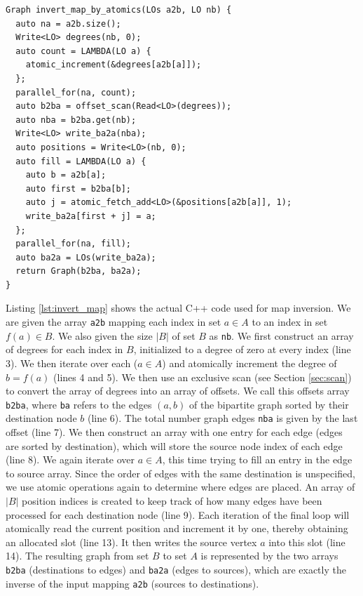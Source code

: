 \begin{lstlisting}[float,style=dan-style,caption=Invert map by atomics,label=lst:invert_map]
Graph invert_map_by_atomics(LOs a2b, LO nb) {
  auto na = a2b.size();
  Write<LO> degrees(nb, 0);
  auto count = LAMBDA(LO a) {
    atomic_increment(&degrees[a2b[a]]);
  };
  parallel_for(na, count);
  auto b2ba = offset_scan(Read<LO>(degrees));
  auto nba = b2ba.get(nb);
  Write<LO> write_ba2a(nba);
  auto positions = Write<LO>(nb, 0);
  auto fill = LAMBDA(LO a) {
    auto b = a2b[a];
    auto first = b2ba[b];
    auto j = atomic_fetch_add<LO>(&positions[a2b[a]], 1);
    write_ba2a[first + j] = a;
  };
  parallel_for(na, fill);
  auto ba2a = LOs(write_ba2a);
  return Graph(b2ba, ba2a);
}
\end{lstlisting}

Listing \ref{lst:invert_map} shows the actual C++ code used for map inversion.
We are given the array \texttt{a2b} mapping each index in set $a\in A$ to an
index in set $f(a)\in B$.
We also given the size $|B|$ of set $B$ as \texttt{nb}.
We first construct an array of degrees for each index in $B$,
initialized to a degree of zero at every index (line 3).
We then iterate over each ($a\in A$) and atomically increment the
degree of $b=f(a)$ (lines 4 and 5).
We then use an exclusive scan (see Section \ref{sec:scan})
to convert the array of degrees into an array of offsets.
We call this offsets array \texttt{b2ba}, where \texttt{ba}
refers to the edges $(a,b)$ of the bipartite graph sorted
by their destination node $b$ (line 6).
The total number graph edges \texttt{nba} is given by the
last offset (line 7).
We then construct an array with one entry for each edge
(edges are sorted by destination), which will store
the source node index of each edge (line 8).
We again iterate over $a\in A$, this time trying to fill
an entry in the edge to source array.
Since the order of edges with the same destination is unspecified,
we use atomic operations again to determine where edges are placed.
An array of $|B|$ position indices is created to keep track of
how many edges have been processed for each destination node (line 9).
Each iteration of the final loop will atomically read the current
position and increment it by one, thereby obtaining an allocated slot
(line 13).
It then writes the source vertex $a$ into this slot (line 14).
The resulting graph from set $B$ to set $A$ is represented by the
two arrays \texttt{b2ba} (destinations to edges) and \texttt{ba2a}
(edges to sources), which are exactly the inverse of the
input mapping \texttt{a2b} (sources to destinations).

